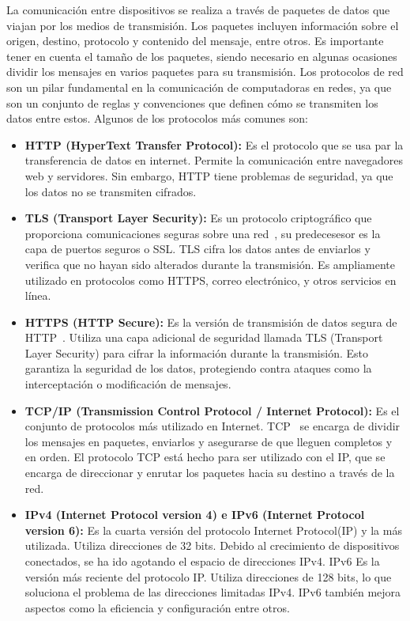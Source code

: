 La comunicación entre dispositivos se realiza a través de paquetes de datos que viajan por los medios de transmisión. Los paquetes incluyen información sobre el origen, destino, protocolo y contenido del mensaje, entre otros. Es importante tener en cuenta el tamaño de los paquetes, siendo necesario en algunas ocasiones dividir los mensajes en varios paquetes para su transmisión.
Los protocolos de red son un pilar fundamental en la comunicación de computadoras en redes, ya que son un conjunto de reglas y convenciones que definen cómo se transmiten los datos entre estos.
Algunos de los protocolos más comunes son:
\begin{itemize}
	\item \textbf{HTTP (HyperText Transfer Protocol):} Es el protocolo que se usa par la transferencia de datos en internet. Permite la comunicación entre navegadores web y servidores. Sin embargo, HTTP tiene problemas de seguridad, ya que los datos no se transmiten cifrados.
	\item \textbf{TLS (Transport Layer Security):} Es un protocolo criptográfico que proporciona comunicaciones seguras sobre una red~\cite{SushilJajodia2025}, su predecesesor es la capa de puertos seguros o SSL. TLS cifra los datos antes de enviarlos y verifica que no hayan sido alterados durante la transmisión. Es ampliamente utilizado en protocolos como HTTPS, correo electrónico, y otros servicios en línea.

	\item \textbf{HTTPS (HTTP Secure):} Es la versión de transmisión de datos segura de HTTP~\cite{SushilJajodia2025}. Utiliza una capa adicional de seguridad llamada TLS (Transport Layer Security) para cifrar la información durante la transmisión. Esto garantiza la seguridad de los datos, protegiendo contra ataques como la interceptación o modificación de mensajes. 

	\item \textbf{TCP/IP (Transmission Control Protocol / Internet Protocol):} Es el conjunto de protocolos más utilizado en Internet. TCP~\cite{Protocolo} se encarga de dividir los mensajes en paquetes, enviarlos y asegurarse de que lleguen completos y en orden. El protocolo TCP está hecho para ser utilizado con el IP, que se encarga de direccionar y enrutar los paquetes hacia su destino a través de la red.

	\item \textbf{IPv4 (Internet Protocol version 4) e IPv6 (Internet Protocol version 6):} Es la cuarta versión del protocolo Internet Protocol(IP) y la más utilizada. Utiliza direcciones de 32 bits. Debido al crecimiento de dispositivos conectados, se ha ido agotando el espacio de direcciones IPv4.
	IPv6 Es la versión más reciente del protocolo IP. Utiliza direcciones de 128 bits, lo que soluciona el problema de las direcciones limitadas IPv4. IPv6 también mejora aspectos como la eficiencia y configuración entre otros.


\end{itemize}
